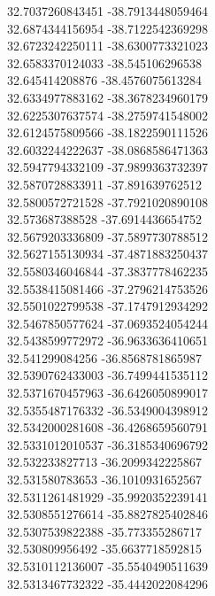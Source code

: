{32.7037260843451	-38.7913448059464\\
32.6874344156954	-38.7122542369298\\
32.6723242250111	-38.6300773321023\\
32.6583370124033	-38.545106296538\\
32.645414208876	-38.4576075613284\\
32.6334977883162	-38.3678234960179\\
32.6225307637574	-38.2759741548002\\
32.6124575809566	-38.1822590111526\\
32.6032244222637	-38.0868586471363\\
32.5947794332109	-37.9899363732397\\
32.5870728833911	-37.891639762512\\
32.5800572721528	-37.7921020890108\\
32.573687388528	-37.6914436654752\\
32.5679203336809	-37.5897730788512\\
32.5627155130934	-37.4871883250437\\
32.5580346046844	-37.3837778462235\\
32.5538415081466	-37.2796214753526\\
32.5501022799538	-37.1747912934292\\
32.5467850577624	-37.0693524054244\\
32.5438599772972	-36.9633636410651\\
32.541299084256	-36.8568781865987\\
32.5390762433003	-36.7499441535112\\
32.5371670457963	-36.6426050899017\\
32.5355487176332	-36.5349004398912\\
32.5342000281608	-36.4268659560791\\
32.5331012010537	-36.3185340696792\\
32.532233827713	-36.2099342225867\\
32.531580783653	-36.1010931652567\\
32.5311261481929	-35.9920352239141\\
32.5308551276614	-35.8827825402846\\
32.5307539822388	-35.773355286717\\
32.530809956492	-35.6637718592815\\
32.5310112136007	-35.5540490511639\\
32.5313467732322	-35.4442022084296\\
}

